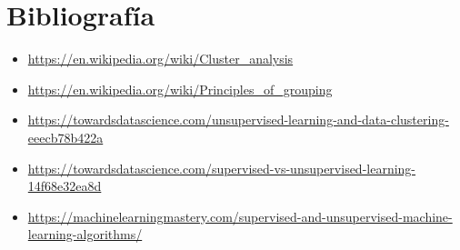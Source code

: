 \documentclass[11pt,a4paper]{article}
\begin{document}
\pagebreak
\section{Bibliografía}
\begin{itemize}
	\item \url{https://en.wikipedia.org/wiki/Cluster_analysis}
	\item \url{https://en.wikipedia.org/wiki/Principles_of_grouping}
	\item \url{https://towardsdatascience.com/unsupervised-learning-and-data-clustering-eeecb78b422a}
	\item \url{https://towardsdatascience.com/supervised-vs-unsupervised-learning-14f68e32ea8d}
	\item \url{https://machinelearningmastery.com/supervised-and-unsupervised-machine-learning-algorithms/}
\end{itemize}
\end{document}

